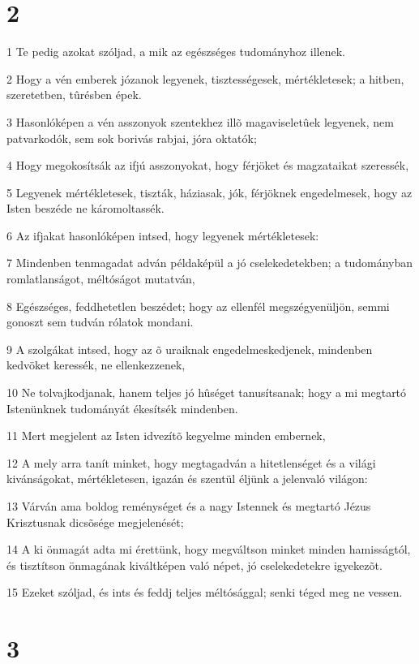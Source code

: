 \chapter{2}

\par 1 Te pedig azokat szóljad, a mik az egészséges tudományhoz illenek.
\par 2 Hogy a vén emberek józanok legyenek, tisztességesek, mértékletesek; a hitben, szeretetben, tûrésben épek.
\par 3 Hasonlóképen a vén asszonyok szentekhez illõ magaviseletûek legyenek, nem patvarkodók, sem sok borivás rabjai, jóra oktatók;
\par 4 Hogy megokosítsák az ifjú asszonyokat, hogy férjöket és magzataikat szeressék,
\par 5 Legyenek mértékletesek, tiszták, háziasak, jók, férjöknek engedelmesek, hogy az Isten beszéde ne  káromoltassék.
\par 6 Az ifjakat hasonlóképen intsed, hogy legyenek mértékletesek:
\par 7 Mindenben tenmagadat adván példaképül a jó cselekedetekben; a tudományban romlatlanságot, méltóságot mutatván,
\par 8 Egészséges, feddhetetlen beszédet; hogy az ellenfél megszégyenüljön, semmi gonoszt sem tudván rólatok mondani.
\par 9 A szolgákat intsed, hogy az õ uraiknak engedelmeskedjenek, mindenben kedvöket keressék, ne ellenkezzenek,
\par 10 Ne tolvajkodjanak, hanem teljes jó hûséget tanusítsanak; hogy a mi megtartó Istenünknek tudományát ékesítsék mindenben.
\par 11 Mert megjelent az Isten idvezítõ kegyelme minden embernek,
\par 12 A mely arra tanít minket, hogy megtagadván a hitetlenséget és a világi kivánságokat, mértékletesen, igazán és szentül éljünk a jelenvaló világon:
\par 13 Várván ama boldog reménységet és a nagy Istennek és megtartó Jézus Krisztusnak dicsõsége megjelenését;
\par 14 A ki önmagát adta mi érettünk, hogy megváltson minket minden hamisságtól, és tisztítson önmagának kiváltképen való népet, jó cselekedetekre igyekezõt.
\par 15 Ezeket szóljad, és ints és feddj teljes méltósággal; senki téged meg ne vessen.

\chapter{3}

